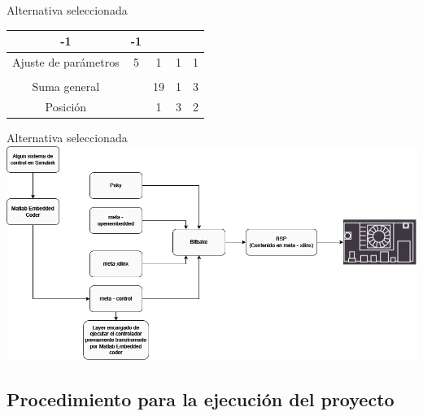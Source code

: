 \documentclass[10pt,aspectratio=169]{beamer} %
\begin{document}
\begin{frame}{Alternativa seleccionada}
\begin{table}[h!]
{\begin{tabular}{ccccc}
      \multicolumn{1}{c|}{-1} &
      \multicolumn{1}{c|}{-1} \\ \hline
    \multicolumn{1}{|c|}{\cellcolor[HTML]{93C47D} Ajuste de parámetros} &
      \multicolumn{1}{c|}{5} &
      \multicolumn{1}{c|}{1} &
      \multicolumn{1}{c|}{1} &
      \multicolumn{1}{c|}{1} \\ \hline
    \multicolumn{1}{l}{} &
      \multicolumn{1}{l}{} &
      \multicolumn{1}{l}{} &
      \multicolumn{1}{l}{} &
      \multicolumn{1}{l}{} \\ \hline
    \multicolumn{1}{|c|}{\cellcolor[HTML]{93C47D} Suma general} &
      \multicolumn{1}{l|}{} &
      \multicolumn{1}{c|}{19} &
      \multicolumn{1}{c|}{1} &
      \multicolumn{1}{c|}{3} \\ \hline
    \multicolumn{1}{|c|}{\cellcolor[HTML]{93C47D} Posición} &
      \multicolumn{1}{l|}{} &
      \multicolumn{1}{c|}{1} &
      \multicolumn{1}{c|}{3} &
      \multicolumn{1}{c|}{2} \\ \hline
    \end{tabular}%
    }
    \end{table}
\end{frame}

\begin{frame}{Alternativa seleccionada}
  \includegraphics[width=\textwidth]{fig/yocto_final.png}
\end{frame}

\subsection{Procedimiento para la ejecución del proyecto}
\end{document}
